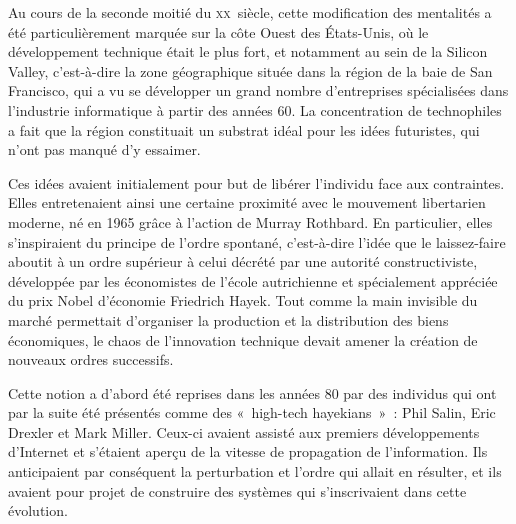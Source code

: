 
Au cours de la seconde moitié du \textsc{xx}\ieme{}~siècle, cette modification des mentalités a été particulièrement marquée sur la côte Ouest des États-Unis, où le développement technique était le plus fort, et notamment au sein de la Silicon Valley, c'est-à-dire la zone géographique située dans la région de la baie de San Francisco, qui a vu se développer un grand nombre d'entreprises spécialisées dans l'industrie informatique à partir des années 60. La concentration de technophiles a fait que la région constituait un substrat idéal pour les idées futuristes, qui n'ont pas manqué d'y essaimer.

Ces idées avaient initialement pour but de libérer l'individu face aux contraintes. Elles entretenaient ainsi une certaine proximité avec le mouvement libertarien moderne, né en 1965 grâce à l'action de Murray Rothbard. En particulier, elles s'inspiraient du principe de l'ordre spontané, c'est-à-dire l'idée que le laissez-faire aboutit à un ordre supérieur à celui décrété par une autorité constructiviste, développée par les économistes de l'école autrichienne et spécialement appréciée du prix Nobel d'économie Friedrich Hayek. Tout comme la main invisible du marché permettait d'organiser la production et la distribution des biens économiques, le chaos de l'innovation technique devait amener la création de nouveaux ordres successifs.

Cette notion a d'abord été reprises dans les années 80 par des individus qui ont par la suite été présentés comme des «~high-tech hayekians~»~: Phil Salin, Eric Drexler et Mark Miller. Ceux-ci avaient assisté aux premiers développements d'Internet et s'étaient aperçu de la vitesse de propagation de l'information. Ils anticipaient par conséquent la perturbation et l'ordre qui allait en résulter, et ils avaient pour projet de construire des systèmes qui s'inscrivaient dans cette évolution. %

